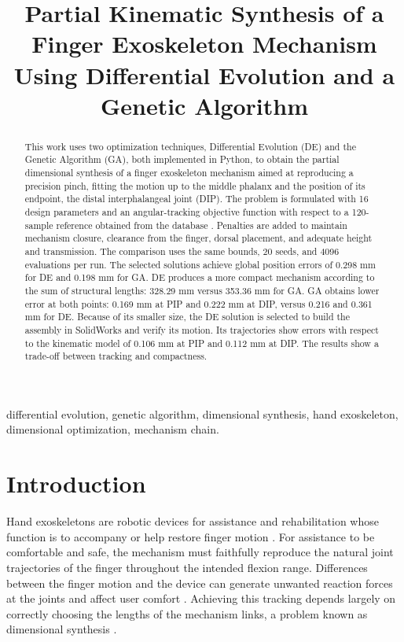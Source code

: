 \documentclass[conference,letterpaper]{IEEEtran}
\title{Partial Kinematic Synthesis of a Finger Exoskeleton Mechanism Using Differential Evolution and a Genetic Algorithm}
\author{}
\begin{document}
\maketitle
\begin{abstract}
This work uses two optimization techniques, Differential Evolution (DE) and the Genetic Algorithm (GA), both implemented in Python, to obtain the partial dimensional synthesis of a finger exoskeleton mechanism aimed at reproducing a precision pinch, fitting the motion up to the middle phalanx and the position of its endpoint, the distal interphalangeal joint (DIP). The problem is formulated with 16 design parameters and an angular-tracking objective function with respect to a 120-sample reference obtained from the database \cite{r1}. Penalties are added to maintain mechanism closure, clearance from the finger, dorsal placement, and adequate height and transmission. The comparison uses the same bounds, 20 seeds, and 4096 evaluations per run. The selected solutions achieve global position errors of 0.298 mm for DE and 0.198 mm for GA. DE produces a more compact mechanism according to the sum of structural lengths: 328.29 mm versus 353.36 mm for GA. GA obtains lower error at both points: 0.169 mm at PIP and 0.222 mm at DIP, versus 0.216 and 0.361 mm for DE. Because of its smaller size, the DE solution is selected to build the assembly in SolidWorks and verify its motion. Its trajectories show errors with respect to the kinematic model of 0.106 mm at PIP and 0.112 mm at DIP. The results show a trade-off between tracking and compactness.
\end{abstract}
\begin{IEEEkeywords}
differential evolution, genetic algorithm, dimensional synthesis, hand exoskeleton, dimensional optimization, mechanism chain.
\end{IEEEkeywords}

\section{Introduction}
Hand exoskeletons are robotic devices for assistance and rehabilitation whose function is to accompany or help restore finger motion \cite{r2}. For assistance to be comfortable and safe, the mechanism must faithfully reproduce the natural joint trajectories of the finger throughout the intended flexion range. Differences between the finger motion and the device can generate unwanted reaction forces at the joints and affect user comfort \cite{r3}. Achieving this tracking depends largely on correctly choosing the lengths of the mechanism links, a problem known as dimensional synthesis \cite{r4}.
\end{document}
